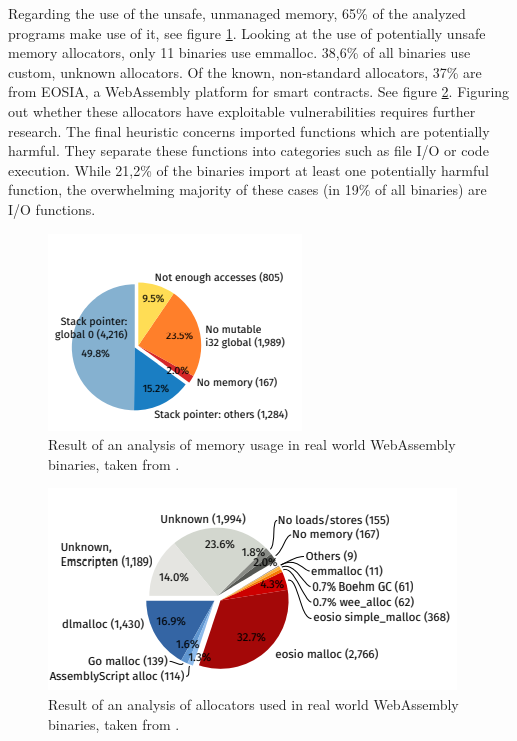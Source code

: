 \documentclass[sigconf]{acmart}
\begin{document}
{Regarding the use of the unsafe, unmanaged memory, 65\% of the analyzed programs make use of it, see figure \ref{fig:analysis_unmanaged_stack}. Looking at the use of potentially unsafe memory allocators, only 11 binaries use emmalloc. 38,6\% of all binaries use custom, unknown allocators. Of the known, non-standard allocators, 37\% are from EOSIA, a WebAssembly platform for smart contracts. See figure \ref{fig:analysis_used_alloc}. Figuring out whether these allocators have exploitable vulnerabilities requires further research. The final heuristic concerns imported functions which are potentially harmful. They separate these functions into categories such as file I/O or code execution. While 21,2\% of the binaries import at least one potentially harmful function, the overwhelming majority of these cases (in 19\% of all binaries) are I/O functions. 

\begin{figure}[h]
  \centering
  \includegraphics[scale=1]{analysis_unmanaged_stack}
  \caption{Result of an analysis of memory usage in real world WebAssembly binaries, taken from \cite{hilbig_empirical_2021}.}  
\label{fig:analysis_unmanaged_stack}
\end{figure}

\begin{figure}[h]
  \centering
  \includegraphics[scale=1]{analysis_used_alloc}
  \caption{Result of an analysis of allocators used in real world WebAssembly binaries, taken from \cite{hilbig_empirical_2021}.}  
\label{fig:analysis_used_alloc}
\end{figure}

}
\end{document}
